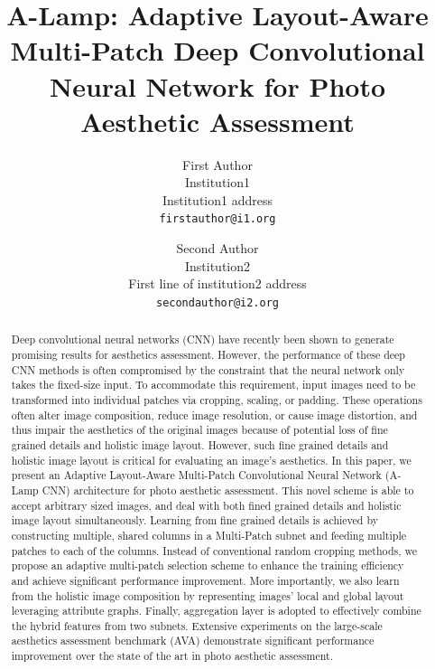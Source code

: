 \documentclass[10pt,twocolumn,letterpaper]{article}
\begin{document}
\title{A-Lamp: Adaptive Layout-Aware Multi-Patch Deep Convolutional Neural Network for Photo Aesthetic Assessment}

\author{First Author\\
Institution1\\
Institution1 address\\
{\tt\small firstauthor@i1.org}
\and
Second Author\\
Institution2\\
First line of institution2 address\\
{\tt\small secondauthor@i2.org}
}

\maketitle
\begin{abstract}	
	
Deep convolutional neural networks (CNN) have recently been shown to generate promising results for aesthetics assessment. However, the performance of these deep CNN methods is often compromised by the constraint that the neural network only takes the fixed-size input. To accommodate this requirement, input images need to be transformed into individual patches via cropping, scaling, or padding. These operations often alter image composition, reduce image resolution, or cause image distortion, and thus impair the aesthetics of the original images because of potential loss of fine grained details and holistic image layout. However, such fine grained details and holistic image layout is critical for evaluating an image’s aesthetics. In this paper, we present an Adaptive Layout-Aware Multi-Patch Convolutional Neural Network (A-Lamp CNN) architecture for photo aesthetic assessment. This novel scheme is able to accept arbitrary sized images, and deal with both fined grained details and holistic image layout simultaneously. Learning from fine grained details is achieved by constructing multiple, shared columns in a Multi-Patch subnet and feeding multiple patches to each of the columns. Instead of conventional random cropping methods, we propose an adaptive multi-patch selection scheme to enhance the training efficiency and achieve significant performance improvement. More importantly, we also learn from the holistic image composition by representing images’ local and global layout leveraging attribute graphs. Finally, aggregation layer is adopted to effectively combine the hybrid features from two subnets. Extensive experiments on the large-scale aesthetics assessment benchmark (AVA) demonstrate significant performance improvement over the state of the art in photo aesthetic assessment.

\end{abstract}
\end{document}
